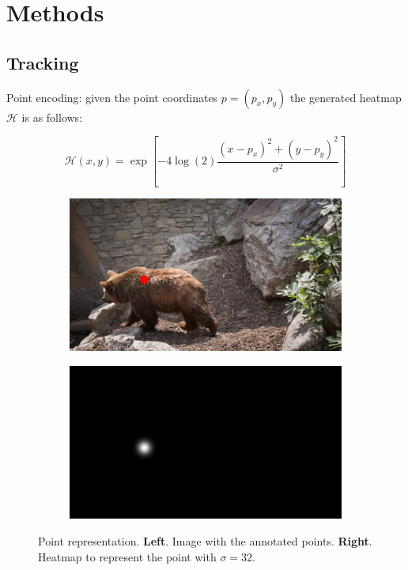 
\chapter{Methods}
\label{cha:methods}

\section{Tracking}
\label{sec:methods_tracking}



Point encoding: given the point coordinates $p = (p_x, p_y)$ the generated heatmap $\mathcal{H}$ is as follows:

\begin{equation}
  \mathcal{H}(x, y) = \exp \left[ -4 \log(2) \frac{ (x - p_x)^2 + (y - p_y)^2 }{ \sigma^2 } \right]
\end{equation}


\begin{figure}[h]
\centering
\begin{subfigure}{.5\textwidth}
  \centering
  \includegraphics[width=.8\linewidth]{figures/methods/heatmaps/image_point.png}
\end{subfigure}%
\begin{subfigure}{.5\textwidth}
  \centering
  \includegraphics[width=.8\linewidth]{figures/methods/heatmaps/heatmap.png}
\end{subfigure}
\label{fig:point_representation}
\caption{
Point representation.
\textbf{Left}. Image with the annotated points.
\textbf{Right}. Heatmap to represent the point with $\sigma = 32$. }
\end{figure}

